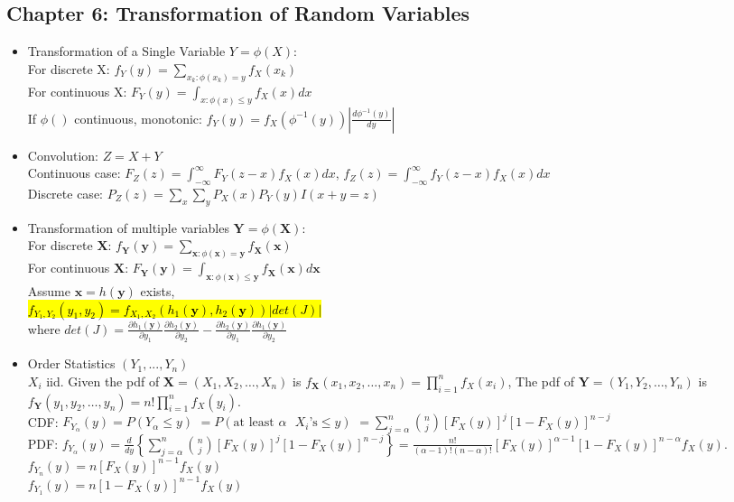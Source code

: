 \documentclass[a4paper,10pt]{article}
\begin{document}
\begin{multicols}{2}
\section*{Chapter 6: Transformation of Random Variables}
\begin{itemize}
    \item Transformation of a Single Variable $Y=\phi(X)$:\\
    For discrete X: $f_Y(y)=\sum_{x_k:\phi (x_k)=y}f_X(x_k)$\\
    For continuous X: $F_Y(y)=\int_{x:\phi (x)\le y}f_X(x)dx$\\
    If $\phi()$ continuous, monotonic: $f_Y(y)=f_X(\phi^{-1}(y))|\frac{d\phi^{-1}(y)}{dy}|$
    \item Convolution: $Z=X+Y$\\
    Continuous case: $F_Z(z)=\int_{-\infty}^\infty F_Y(z-x)f_X(x)dx$, $f_Z(z)=\int_{-\infty}^\infty f_Y(z-x)f_X(x)dx$\\
    Discrete case: $P_Z(z)=\sum_x\sum_yP_X(x)P_Y(y)I(x+y=z)$\\
    \item Transformation of multiple variables $\textbf{Y}=\phi(\textbf{X})$:\\
    For discrete $\textbf{X}$: $f_\textbf{Y}(\textbf{y})=\sum_{\textbf{x}:\phi (\textbf{x})=\textbf{y}}f_\textbf{X}(\textbf{x})$\\
    For continuous $\textbf{X}$: $F_\textbf{Y}(\textbf{y})=\int_{\textbf{x}:\phi (\textbf{x})\le \textbf{y}}f_\textbf{X}(\textbf{x})d\textbf{x}$\\
    Assume $\textbf{x}=h(\textbf{y})$ exists, \\
    \hl{$f_{Y_1,Y_2}(y_1,y_2)=f_{X_1,X_2}(h_1(\textbf{y}),h_2(\textbf{y}))|det(J)|$}\\
    where $det(J)=\frac{\partial h_1(\textbf{y})}{\partial y_1}\frac{\partial h_2(\textbf{y})}{\partial y_2}-\frac{\partial h_2(\textbf{y})}{\partial y_1}\frac{\partial h_1(\textbf{y})}{\partial y_2}$
    \item Order Statistics $(Y_1,...,Y_n)$\\
    $X_i$ iid. Given the pdf of $\mathbf{X} = (X_1, X_2, \ldots, X_n)$ is $f_{\mathbf{X}}(x_1, x_2, \ldots, x_n) = \prod_{i=1}^n f_X(x_i)$, 
    The pdf of $\mathbf{Y} = (Y_1, Y_2, \ldots, Y_n)$ is $f_{\mathbf{Y}}(y_1, y_2, \ldots, y_n) = n! \prod_{i=1}^n f_X(y_i)$.\\
    CDF: $F_{Y_\alpha}(y) = P(Y_\alpha \leq y)$ 
    $= P(\text{at least } \alpha \text{ } X_i\text{'s} \leq y)$ 
    $= \sum_{j=\alpha}^n \binom{n}{j} [F_X(y)]^j [1 - F_X(y)]^{n-j}$\\
    PDF: $f_{Y_\alpha}(y) = \frac{d}{dy} \left\{ \sum_{j=\alpha}^n \binom{n}{j} [F_X(y)]^j [1 - F_X(y)]^{n-j} \right\}
    = \frac{n!}{(\alpha-1)!(n-\alpha)!} [F_X(y)]^{\alpha-1} [1 - F_X(y)]^{n-\alpha} f_X(y).$\\
    $f_{Y_n}(y) = n [F_X(y)]^{n-1} f_X(y)$\\
    $f_{Y_1}(y) = n [1 - F_X(y)]^{n-1} f_X(y)$\\
\end{itemize}


\end{multicols}
\end{document}

